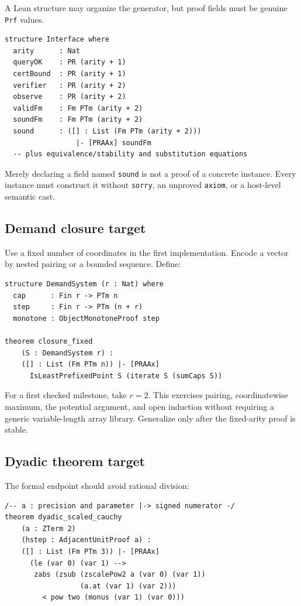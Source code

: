 A Lean structure may organize the generator, but proof fields must be genuine
\texttt{Prf} values.

\begin{lstlisting}[language={},caption={Schematic interface record}]
structure Interface where
  arity      : Nat
  queryOK    : PR (arity + 1)
  certBound  : PR (arity + 1)
  verifier   : PR (arity + 2)
  observe    : PR (arity + 2)
  validFm    : Fm PTm (arity + 2)
  soundFm    : Fm PTm (arity + 2)
  sound      : ([] : List (Fm PTm (arity + 2)))
                 |- [PRAAx] soundFm
  -- plus equivalence/stability and substitution equations
\end{lstlisting}

Merely declaring a field named \texttt{sound} is not a proof of a concrete
instance.  Every instance must construct it without \texttt{sorry}, an
unproved \texttt{axiom}, or a host-level semantic cast.

\subsection{Demand closure target}

Use a fixed number of coordinates in the first implementation.  Encode a
vector by nested pairing or a bounded sequence.  Define:

\begin{lstlisting}[language={},caption={Demand closure theorem shape}]
structure DemandSystem (r : Nat) where
  cap      : Fin r -> PTm n
  step     : Fin r -> PTm (n + r)
  monotone : ObjectMonotoneProof step

theorem closure_fixed
    (S : DemandSystem r) :
    ([] : List (Fm PTm n)) |- [PRAAx]
      IsLeastPrefixedPoint S (iterate S (sumCaps S))
\end{lstlisting}

For a first checked milestone, take \(r=2\).  This exercises pairing,
coordinatewise maximum, the potential argument, and open induction without
requiring a generic variable-length array library.  Generalize only after the
fixed-arity proof is stable.

\subsection{Dyadic theorem target}

The formal endpoint should avoid rational division:

\begin{lstlisting}[language={},caption={Cleared-denominator Cauchy endpoint}]
/-- a : precision and parameter |-> signed numerator -/
theorem dyadic_scaled_cauchy
    (a : ZTerm 2)
    (hstep : AdjacentUnitProof a) :
    ([] : List (Fm PTm 3)) |- [PRAAx]
      (le (var 0) (var 1) -->
       zabs (zsub (zscalePow2 a (var 0) (var 1))
                  (a.at (var 1) (var 2)))
         < pow two (monus (var 1) (var 0)))
\end{lstlisting}

